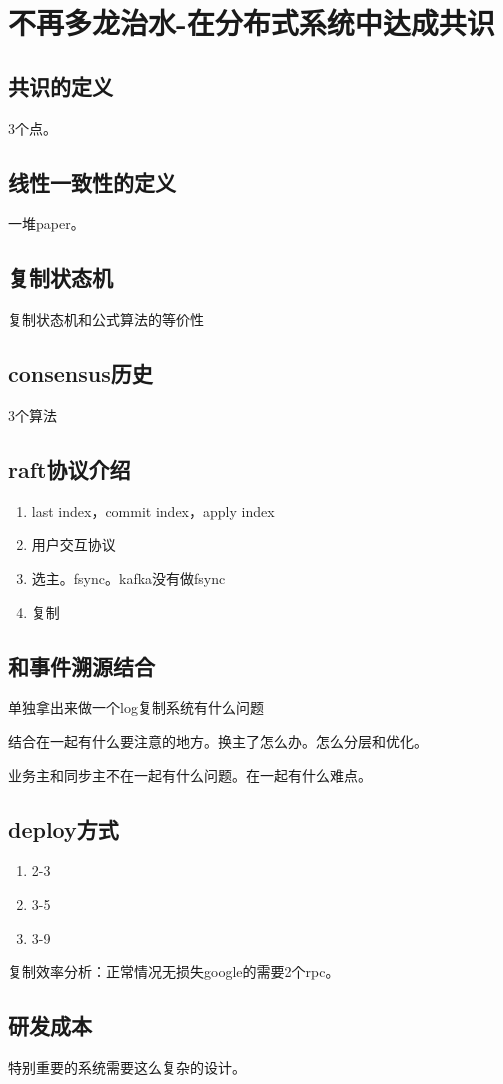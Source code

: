 \chapter{不再多龙治水-在分布式系统中达成共识}



\section{共识的定义}
3个点。

\section{线性一致性的定义}
一堆paper。

\section{复制状态机}
复制状态机和公式算法的等价性

\section{consensus历史}
3个算法

\section{raft协议介绍}
\begin{enumerate}
    \item last index，commit index，apply index
    \item 用户交互协议
    \item 选主。fsync。kafka没有做fsync
    \item 复制
\end{enumerate}



\section{和事件溯源结合}
单独拿出来做一个log复制系统有什么问题

结合在一起有什么要注意的地方。换主了怎么办。怎么分层和优化。

业务主和同步主不在一起有什么问题。在一起有什么难点。

\section{deploy方式}
\begin{enumerate}
    \item 2-3
    \item 3-5
    \item 3-9
\end{enumerate}


复制效率分析：正常情况无损失google的需要2个rpc。

\section{研发成本}
特别重要的系统需要这么复杂的设计。

